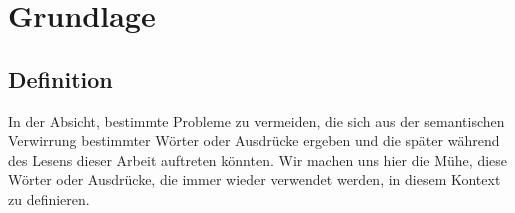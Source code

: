 \chapter{Grundlage \label{kap0}}



\section{Definition \label{kap0_def}}
In der Absicht, bestimmte Probleme zu vermeiden, die sich aus der semantischen Verwirrung bestimmter Wörter oder Ausdrücke ergeben und die später während des Lesens dieser Arbeit auftreten könnten. Wir machen uns hier die Mühe, diese Wörter oder Ausdrücke, die immer wieder verwendet werden, in diesem Kontext zu definieren.

